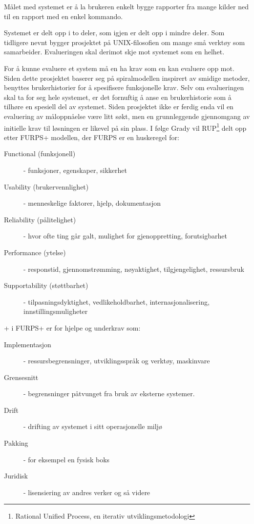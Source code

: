 \documentclass[11pt]{article}
\begin{document}
Målet med systemet er å la brukeren enkelt bygge rapporter fra mange kilder ned til en rapport med en enkel kommando.

Systemet er delt opp i to deler, som igjen er delt opp i mindre deler.
Som tidligere nevnt bygger prosjektet på UNIX-filosofien om mange små verktøy som samarbeider.
Evalueringen skal derimot skje mot systemet som en helhet.

For å kunne evaluere et system må en ha krav som en kan evaluere opp mot.
Siden dette prosjektet baserer seg på spiralmodellen inspirert av smidige metoder,
benyttes brukerhistorier for å spesifisere funksjonelle krav.
Selv om evalueringen skal ta for seg hele systemet,
er det fornuftig å anse en brukerhistorie som å tilhøre en spesiell del av systemet.
Siden prosjektet ikke er ferdig enda vil en evaluering av måloppnåelse være litt søkt,
men en grunnleggende gjennomgang av initielle krav til løsningen er likevel på sin plass.
I følge Grady\cite{Grady1992} vil RUP\footnote{Rational Unified Process, en iterativ utviklingsmetodologi} delt opp etter FURPS+ modellen, der FURPS er en huskeregel for: \\ %
\begin{description}
\item [Functional (funksjonell)]
  - funksjoner, egenskaper, sikkerhet
\item [Usability (brukervennlighet)]
  - menneskelige faktorer, hjelp, dokumentasjon
\item [Reliability (pålitelighet)]
  - hvor ofte ting går galt, mulighet for gjenoppretting, forutsigbarhet
\item [Performance (ytelse)]
  - responstid, gjennomstrømming, nøyaktighet, tilgjengelighet, ressursbruk
\item [Supportability (støttbarhet)]
  - tilpasningsdyktighet, vedlikeholdbarhet, internasjonalisering, innstillingsmuligheter
\end{description}
+ i FURPS+ er for hjelpe og underkrav som:
\begin{description}
\item [Implementasjon]
  - ressursbegrensninger, utviklingsspråk og verktøy, maskinvare
\item [Grensesnitt]
  - begrensninger påtvunget fra bruk av eksterne systemer.
\item [Drift]
  - drifting av systemet i sitt operasjonelle miljø
\item [Pakking]
  - for eksempel en fysisk boks
\item [Juridisk]
  - lisensiering av andres verker og så videre
\end{description}
\end{document}
